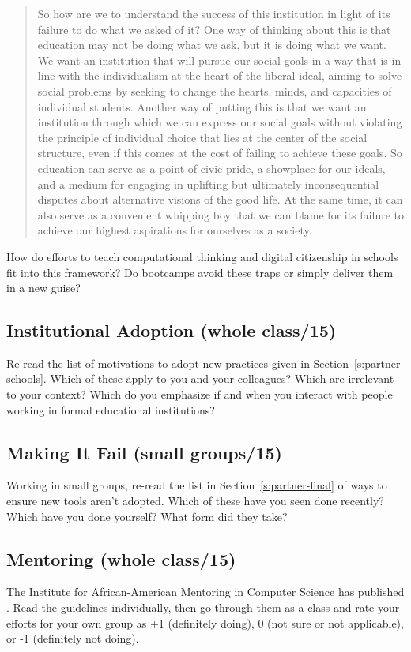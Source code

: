\begin{quote}

  So how are we to understand the success of this institution
  in light of its failure to do what we asked of it?
  One way of thinking about this is that
  education may not be doing what we ask,
  but it is doing what we want.
  We want an institution that will pursue our social goals
  in a way that is in line with the individualism at the heart of the liberal ideal,
  aiming to solve social problems
  by seeking to change the hearts, minds, and capacities of individual students.
  Another way of putting this is that
  we want an institution through which we can express our social goals
  without violating the principle of individual choice
  that lies at the center of the social structure,
  even if this comes at the cost of failing to achieve these goals.
  So education can serve as a point of civic pride,
  a showplace for our ideals,
  and a medium for engaging in uplifting but ultimately inconsequential disputes
  about alternative visions of the good life.
  At the same time,
  it can also serve as a convenient whipping boy
  that we can blame for its failure to achieve our highest aspirations for ourselves as a society.

\end{quote}

How do efforts to teach computational thinking and digital citizenship in schools
fit into this framework?
Do bootcamps avoid these traps or simply deliver them in a new guise?

\subsection*{Institutional Adoption (whole class/15)}

Re-read the list of motivations to adopt new practices
given in Section~\ref{s:partner-schools}.
Which of these apply to you and your colleagues?
Which are irrelevant to your context?
Which do you emphasize
if and when you interact with people working in formal educational institutions?

\subsection*{Making It Fail (small groups/15)}

Working in small groups,
re-read the list in Section~\ref{s:partner-final} of ways to ensure new tools aren't adopted.
Which of these have you seen done recently?
Which have you done yourself?
What form did they take?

\subsection*{Mentoring (whole class/15)}

The Institute for African-American Mentoring in Computer Science
has published .
Read the guidelines individually,
then go through them as a class
and rate your efforts for your own group as +1 (definitely doing),
0 (not sure or not applicable),
or -1 (definitely not doing).
